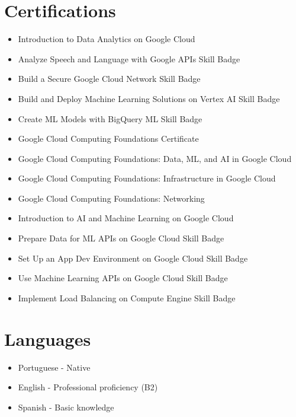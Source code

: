 \documentclass[letterpaper,11pt]{article}
\newcommand{\resumeItem}[1]{
  \item\small{
    {#1 \vspace{-2pt}}
  }
}
\newcommand{\resumeSubHeadingListStart}{\begin{itemize}[leftmargin=0.0in, label={}]}
\newcommand{\resumeSubHeadingListEnd}{\end{itemize}}
\begin{document}
\section{Certifications}
  \resumeSubHeadingListStart
    \resumeItem{Introduction to Data Analytics on Google Cloud}
    \resumeItem{Analyze Speech and Language with Google APIs Skill Badge}
    \resumeItem{Build a Secure Google Cloud Network Skill Badge}
    \resumeItem{Build and Deploy Machine Learning Solutions on Vertex AI Skill Badge}
    \resumeItem{Create ML Models with BigQuery ML Skill Badge}
    \resumeItem{Google Cloud Computing Foundations Certificate}
    \resumeItem{Google Cloud Computing Foundations: Data, ML, and AI in Google Cloud}
    \resumeItem{Google Cloud Computing Foundations: Infrastructure in Google Cloud}
    \resumeItem{Google Cloud Computing Foundations: Networking }
    \resumeItem{Introduction to AI and Machine Learning on Google Cloud}
    \resumeItem{Prepare Data for ML APIs on Google Cloud Skill Badge}
    \resumeItem{Set Up an App Dev Environment on Google Cloud Skill Badge}
    \resumeItem{Use Machine Learning APIs on Google Cloud Skill Badge}
    \resumeItem{Implement Load Balancing on Compute Engine Skill Badge}
  \resumeSubHeadingListEnd
\vspace{-16pt}

\section{Languages}
  \resumeSubHeadingListStart
    \resumeItem{Portuguese - Native}
    \resumeItem{English - Professional proficiency (B2)}
    \resumeItem{Spanish - Basic knowledge}
  \resumeSubHeadingListEnd
\vspace{-16pt}
\end{document}
